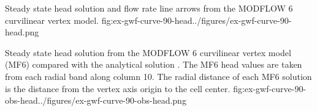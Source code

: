 \begin{StandardFigure}{
                                     Steady state head solution and flow rate line arrows from the MODFLOW 6 curvilinear vertex model.
                                     }{fig:ex-gwf-curve-90-head}{../figures/ex-gwf-curve-90-head.png}
\end{StandardFigure}

\begin{StandardFigure}{
                                     Steady state head solution from the MODFLOW 6 curvilinear vertex model (MF6) compared with the analytical solution \citep{crank1975diffusion}.
                                     The MF6 head values are taken from each radial band along column 10.
                                     The radial distance of each MF6 solution is the distance from the vertex axis origin to the cell center.
                                     }{fig:ex-gwf-curve-90-obs-head}{../figures/ex-gwf-curve-90-obs-head.png}
\end{StandardFigure}
